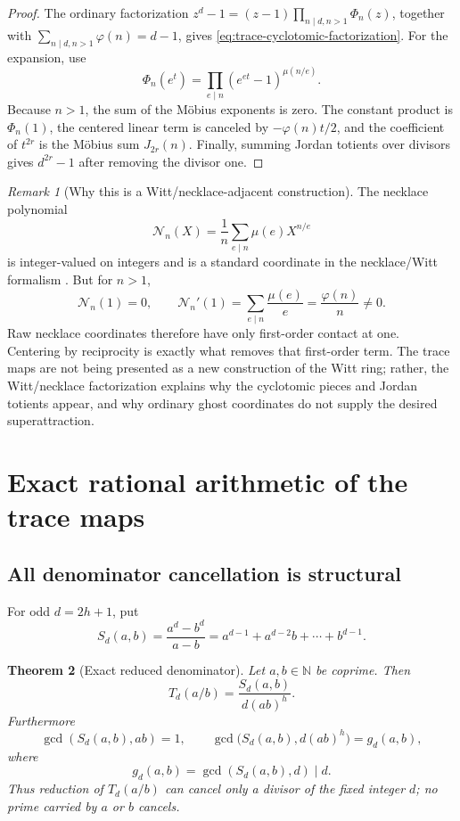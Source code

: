 \documentclass[11pt,oneside]{article}
\newtheorem{theorem}{Theorem}[section]
\theoremstyle{definition}
\theoremstyle{remark}
\newtheorem{remark}[theorem]{Remark}
\newcommand{\N}{\mathbb N}
\begin{document}
\begin{proof}
The ordinary factorization
\(z^d-1=(z-1)\prod_{n\mid d,n>1}\Phi_n(z)\), together with
\(\sum_{n\mid d,n>1}\varphi(n)=d-1\), gives
\eqref{eq:trace-cyclotomic-factorization}.  For the expansion, use
\[
 \Phi_n(e^t)=\prod_{e\mid n}(e^{et}-1)^{\mu(n/e)}.
\]
Because \(n>1\), the sum of the M\"obius exponents is zero.  The constant product is
\(\Phi_n(1)\), the centered linear term is canceled by
\(-\varphi(n)t/2\), and the coefficient of \(t^{2r}\) is the M\"obius sum
\(J_{2r}(n)\).  Finally, summing Jordan totients over divisors gives \(d^{2r}-1\) after
removing the divisor one.
\end{proof}

\begin{remark}[Why this is a Witt/necklace-adjacent construction]
The necklace polynomial
\[
 \mathcal N_n(X)=\frac1n\sum_{e\mid n}\mu(e)X^{n/e}
\]
is integer-valued on integers and is a standard coordinate in the necklace/Witt formalism
\cite{MetropolisRota1983}.  But for \(n>1\),
\[
 \mathcal N_n(1)=0,
 \qquad \mathcal N_n'(1)=\sum_{e\mid n}\frac{\mu(e)}e=\frac{\varphi(n)}n\ne0.
\]
Raw necklace coordinates therefore have only first-order contact at one.  Centering by
reciprocity is exactly what removes that first-order term.  The trace maps are not being
presented as a new construction of the Witt ring; rather, the Witt/necklace factorization
explains why the cyclotomic pieces and Jordan totients appear, and why ordinary ghost
coordinates do not supply the desired superattraction.
\end{remark}

\section{Exact rational arithmetic of the trace maps}
\label{sec:rational-arithmetic}

\subsection{All denominator cancellation is structural}

For odd \(d=2h+1\), put
\begin{equation}
 S_d(a,b)=\frac{a^d-b^d}{a-b}
 =a^{d-1}+a^{d-2}b+\cdots+b^{d-1}.
 \label{eq:Sd}
\end{equation}

\begin{theorem}[Exact reduced denominator]
\label{thm:exact-denominator}
Let \(a,b\in\N\) be coprime.  Then
\begin{equation}
 T_d(a/b)=\frac{S_d(a,b)}{d(ab)^h}.
 \label{eq:rational-Td}
\end{equation}
Furthermore
\begin{equation}
 \gcd(S_d(a,b),ab)=1,
 \qquad
 \gcd\bigl(S_d(a,b),d(ab)^h\bigr)=g_d(a,b),
 \label{eq:exact-gd}
\end{equation}
where
\begin{equation}
 g_d(a,b)=\gcd(S_d(a,b),d)\mid d.
 \label{eq:gd-definition}
\end{equation}
Thus reduction of \(T_d(a/b)\) can cancel only a divisor of the fixed integer \(d\); no
prime carried by \(a\) or \(b\) cancels.
\end{theorem}
\end{document}
